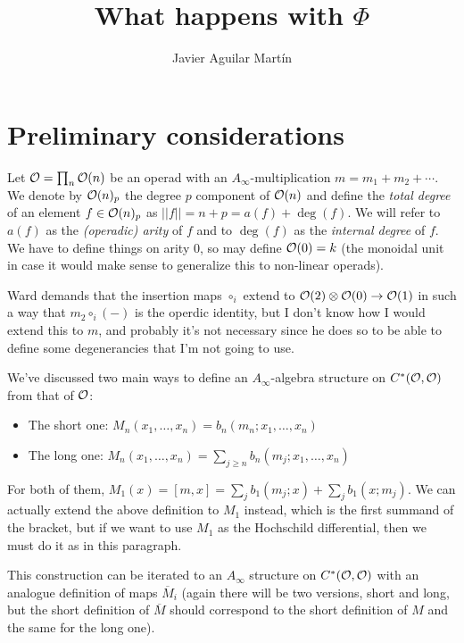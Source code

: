 \documentclass[twoside]{article}
\begin{document}
\title{What happens with $\Phi$}
\author{Javier Aguilar Martín}
\maketitle

\section{Preliminary considerations}

Let $\mathcal{O}=\prod_n{\mathcal O}(n)$ be an operad with an $A_\infty$-multiplication $m=m_1+m_2+\cdots$. We denote by ${\mathcal O}(n)_p$ the degree $p$ component of ${\mathcal O}(n)$ and define the \emph{total degree} of an element $f\in {\mathcal O}(n)_p$ as $||f||=n+p=a(f)+\deg(f)$. We will refer to $a(f)$ as the \emph{(operadic) arity} of $f$ and to $\deg(f)$ as the \emph{internal degree} of $f$. We have to define things on arity 0, so may define ${\mathcal O}(0)=k$ (the monoidal unit in case it would make sense to generalize this to non-linear operads). 

\begin{remark}Ward demands that the insertion maps $\circ_i$ extend to ${\mathcal O}(2)\otimes{\mathcal O}(0)\to {\mathcal O}(1)$ in such a way that $m_2\circ_i(-)$ is the operdic identity, but I don't know how I would extend this to $m$, and probably it's not necessary since he does so to be able to define some degenerancies that I'm not going to use.
\end{remark}

We've discussed two main ways to define an $A_\infty$-algebra structure on $C^*({\mathcal O},{\mathcal O})$ from that of ${\mathcal O}$:
\begin{itemize}
\item The short one: $M_n(x_1,\dots, x_n)=b_n(m_n;x_1,\dots, x_n)$
\item The long one: $M_n(x_1,\dots, x_n)=\sum_{j\geq n}b_n(m_j;x_1,\dots, x_n)$
\end{itemize}

For both of them, $M_1(x)=[m,x]=\sum_j b_1(m_j;x)+\sum_jb_1(x;m_j)$. We can actually extend the above definition to $M_1$ instead, which is the first summand of the bracket, but if we want to use $M_1$ as the Hochschild differential, then we must do it as in this paragraph.

This construction can be iterated to an $A_\infty$ structure on $C^*({\mathcal O},{\mathcal O})$ with an analogue definition of maps $\overline{M}_i$ (again there will be two versions, short and long, but the short definition of $\overline{M}$ should correspond to the short definition of $M$ and the same for the long one).
\end{document}

